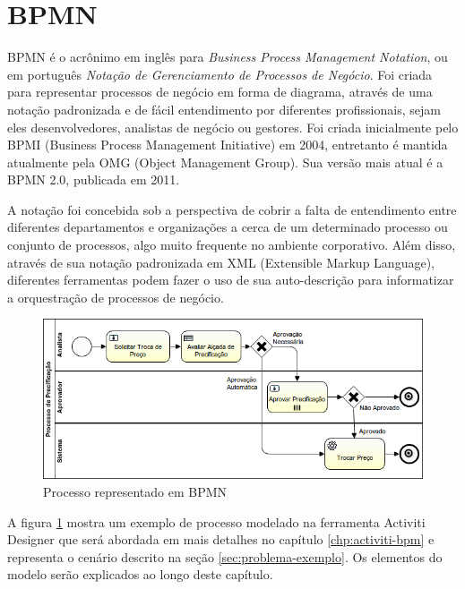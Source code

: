 \section{BPMN}\label{sec:bpm-bpmn}
BPMN\cite{bpmn} é o acrônimo em inglês para \textit{Business Process Management Notation}, ou em português \textit{Notação de Gerenciamento de Processos de Negócio}. Foi criada para representar processos de negócio em forma de diagrama, através de uma notação padronizada e de fácil entendimento por diferentes profissionais, sejam eles desenvolvedores, analistas de negócio ou gestores. Foi criada inicialmente pelo BPMI\cite{bpmi} (Business Process Management Initiative) em 2004, entretanto é mantida atualmente pela OMG\cite{omg} (Object Management Group). Sua versão mais atual é a BPMN 2.0\cite{bpmn20}, publicada em 2011.

A notação foi concebida sob a perspectiva de cobrir a falta de entendimento entre diferentes departamentos e organizações a cerca de um determinado processo ou conjunto de processos, algo muito frequente no ambiente corporativo. Além disso, através de sua notação padronizada em XML\cite{xml} (Extensible Markup Language), diferentes ferramentas podem fazer o uso de sua auto-descrição para informatizar a orquestração de processos de negócio.



\begin{figure}[H]
  \centering
  \includegraphics[width=1.0\textwidth]{imagens/ProcessoDePrecificacao.png}
  \caption{Processo representado em BPMN}
  \label{fig:exemplo_bpmn}
\end{figure}

A figura \ref{fig:exemplo_bpmn} mostra um exemplo de processo modelado na ferramenta Activiti Designer que será abordada em mais detalhes no capítulo \ref{chp:activiti-bpm} e representa o cenário descrito na seção \ref{sec:problema-exemplo}. Os elementos do modelo serão explicados ao longo deste capítulo.


